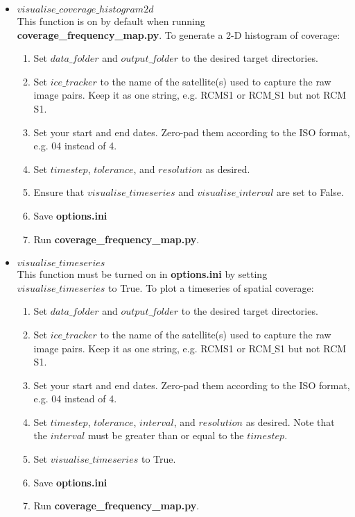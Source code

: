 \documentclass{article}
\begin{document}
        \begin{itemize}
            \item{} $visualise\_coverage\_histogram2d$ \\

            This function is on by default when running \textbf{coverage\_frequency\_map.py}. To generate a 2-D histogram of coverage:
            \begin{enumerate}
                \item Set $data\_folder$ and $output\_folder$ to the desired target directories.
                \item Set $ice\_tracker$ to the name of the satellite(s) used to capture the raw image pairs. Keep it as one string, e.g. RCMS1 or RCM$\_$S1 but not RCM S1.
                \item Set your start and end dates. Zero-pad them according to the ISO format, e.g. 04 instead of 4.
                \item Set $timestep$, $tolerance$, and $resolution$ as desired.
                \item Ensure that $visualise\_timeseries$ and $visualise\_interval$ are set to False.
                \item Save \textbf{options.ini}
                \item Run \textbf{coverage\_frequency\_map.py}.
            \end{enumerate}

            \item{} $visualise\_timeseries$ \\
            This function must be turned on in \textbf{options.ini} by setting $visualise\_timeseries$ to True. To plot a timeseries of spatial coverage:
            \begin{enumerate}
                \item Set $data\_folder$ and $output\_folder$ to the desired target directories.
                \item Set $ice\_tracker$ to the name of the satellite(s) used to capture the raw image pairs. Keep it as one string, e.g. RCMS1 or RCM$\_$S1 but not RCM S1.
                \item Set your start and end dates. Zero-pad them according to the ISO format, e.g. 04 instead of 4.
                \item Set $timestep$, $tolerance$, $interval$, and $resolution$ as desired. Note that the $interval$ must be greater than or equal to the $timestep$.
                \item Set $visualise\_timeseries$ to True.
                \item Save \textbf{options.ini}
                \item Run \textbf{coverage\_frequency\_map.py}.
            \end{enumerate}


\end{itemize}
\end{document}
